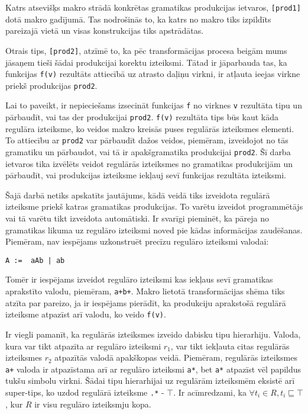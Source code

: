 Katrs atsevišķs makro strādā konkrētas gramatikas produkcijas ietvaros, \verb|[prod1]| dotā makro gadījumā. Tas nodrošinās to, ka katrs no makro tiks izpildīts pareizajā vietā un visas konstrukcijas tiks apstrādātas. 

Otrais tips, \verb|[prod2]|, atzīmē to, ka pēc transformācijas procesa beigām mums jāsaņem tieši šādai produkcijai korektu izteiksmi. Tātad ir jāparbauda tas, ka funkcijas \verb|f(v)| rezultāts attiecībā uz atrasto daļiņu virkni, ir atļauta ieejas virkne priekš produkcijas \verb|prod2|.

Lai to paveikt, ir nepieciešams izsecināt funkcijas \verb|f| no virknes \verb|v| rezultāta tipu un pārbaudīt, vai tas der produkcijai \verb|prod2|. \verb|f(v)| rezultāta tips būs kaut kāda regulāra izteiksme, ko veidos makro kreisās puses regulārās izteiksmes elementi. To attiecību ar \verb|prod2| var pārbaudīt dažos veidos, piemēram, izveidojot no tās gramatiku un pārbaudot, vai tā ir apakšgramatika produkcijai \verb|prod2|. Šī darba ietvaros tika izvēlēts veidot regulārās izteiksmes no gramatikas produkcijām un pārbaudīt, vai produkcijas izteiksme iekļauj sevī funkcijas rezultāta izteiksmi.

Šajā darbā netiks apskatīts jautājums, kādā veidā tiks izveidota regulārā izteiksme priekš katras gramatikas produkcijas. To varētu izveidot programmētājs vai tā varētu tikt izveidota automātiski. Ir svarīgi pieminēt, ka pāreja no gramatikas likuma uz regulāro izteiksmi noved pie kādas informācijas zaudēšanas. Piemēram, nav iespējams uzkonstruēt precīzu regulāro izteiksmi valodai:

\begin{verbatim}
A :=  aAb | ab
\end{verbatim}

Tomēr ir iespējams izveidot regulāro izteiksmi kas iekļaus sevī gramatikas aprakstīto valodu, piemēram, \verb|a+b+|. Makro lietotā transformācijas shēma tiks atzīta par pareizo, ja ir iespējams pierādīt, ka produkciju aprakstošā regulārā izteiksme atpazīst arī valodu, ko veido \verb|f(v)|.

Ir viegli pamanīt, ka regulārās izteiksmes izveido dabisku tipu hierarhiju. Valoda, kura var tikt atpazīta ar regulāro izteiksmi $r_1$, var tikt iekļauta citas regulārās izteiksmes $r_2$ atpazītās valodā apakškopas veidā. Piemēram, regulārās izteiksmes \verb|a+| valoda ir atpazīstama arī ar regulāro izteiksmi \verb|a*|, bet \verb|a*| atpazīst vēl papildus tukšu simbolu virkni. Šādai tipu hierarhijai uz regulārām izteiksmēm eksistē arī super-tips, ko uzdod regulārā izteiksme \verb|.*| - $\top$. Ir acīmredzami, ka $\forall t_i \in R, t_i \sqsubseteq \top$, kur $R$ ir visu regulāro izteiksmju kopa.


